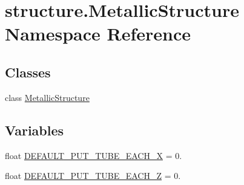 \hypertarget{namespacestructure_1_1_metallic_structure}{\section{structure.\-Metallic\-Structure Namespace Reference}
\label{namespacestructure_1_1_metallic_structure}
}
\subsection*{Classes}
\begin{DoxyCompactItemize}
\item 
class \hyperlink{classstructure_1_1_metallic_structure_1_1_metallic_structure}{Metallic\-Structure}
\end{DoxyCompactItemize}
\subsection*{Variables}
\begin{DoxyCompactItemize}
\item 
float \hyperlink{namespacestructure_1_1_metallic_structure_a8674eec617bff23fb4d9638e13dfafc7}{D\-E\-F\-A\-U\-L\-T\-\_\-\-P\-U\-T\-\_\-\-T\-U\-B\-E\-\_\-\-E\-A\-C\-H\-\_\-\-X} = 0.
\item 
float \hyperlink{namespacestructure_1_1_metallic_structure_a71f9d2400e0b080329fec5e9d3540bd5}{D\-E\-F\-A\-U\-L\-T\-\_\-\-P\-U\-T\-\_\-\-T\-U\-B\-E\-\_\-\-E\-A\-C\-H\-\_\-\-Z} = 0.
\end{DoxyCompactItemize}


